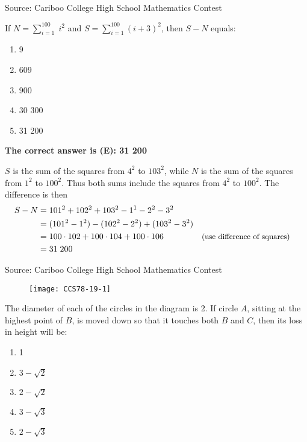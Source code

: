\documentclass{article}
\begin{document}
\scriptsize
Source: Cariboo College High School Mathematics Contest

\normalsize
If $N= {\displaystyle\sum_{i=1}^{100}}\; i^2$ and $S={\displaystyle\sum_{i=1}^{100}} (i+3)^2$, then $S-N$ equals:
\begin{enumerate}[noitemsep,topsep=0mm,leftmargin=*,widest=D,label=\Alph*)]
	\item 9
	\item 609
	\item 900
	\item 30 300
	\item 31 200
\end{enumerate}

\textbf{The correct answer is (E): 31 200}

$S$ is the sum of the squares from $4^2$ to $103^2$, while $N$ is the sum of the squares from $1^2$ to $100^2$. Thus both sums include the squares from $4^2$ to $100^2$. The difference is then
\begin{align*}
S-N &= 101^2+102^2+103^2-1^1-2^2-3^2\\
&= (101^2-1^2)-(102^2-2^2)+(103^2-3^2)\\
&= 100 \cdot 102 + 100 \cdot 104 + 100 \cdot 106 && \text{\small(use difference of squares)}\\
&= 31\;200
\end{align*}

\vskip 1.5cm


\scriptsize
Source: Cariboo College High School Mathematics Contest

\normalsize
\begin{wrapfigure}[5]{r}[0pt]{0pt}
	\texttt{[image: CCS78-19-1]}
\end{wrapfigure}
The diameter of each of the circles in the diagram is 2. If circle $A$, sitting at the highest point of $B$, is moved down so that it touches both $B$ and $C$, then its loss in height will be:
\begin{enumerate}[noitemsep,topsep=0mm,leftmargin=*,widest=D,label=\Alph*)]
	\item 1
	\item $3-\sqrt{2}$
	\item $2-\sqrt{2}$
	\item $3-\sqrt{3}$
	\item $2-\sqrt{3}$
\end{enumerate}
\end{document}
